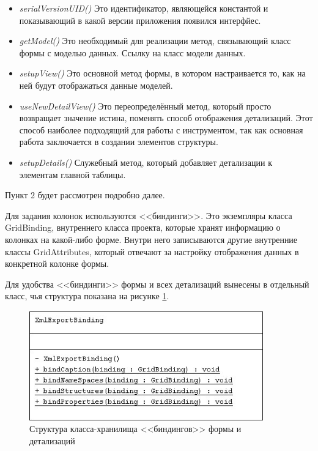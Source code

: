 \documentclass[a4paper,12pt]{diplom}
\begin{document}
\begin{itemize}
    \item \textit{serialVersionUID()} Это идентификатор, являющейся константой и показывающий в какой версии приложения появился интерфйес.
    \item \textit{getModel()} Это необходимый для реализации метод, связывающий класс формы с моделью данных. Ссылку на класс модели данных.
    \item \textit{setupView()} Это основной метод формы, в котором настраивается то, как на ней будут отображаться данные моделей.
    \item \textit{useNewDetailView()} Это переопределённый метод, который просто возвращает значение истина, поменять способ отображения детализаций. Этот способ наиболее подходящий для работы с инструментом, так как основная работа заключается в создании элементов структуры.
    \item \textit{setupDetails()} Служебный метод, который добавляет детализации к элементам главной таблицы.
\end{itemize}

Пункт 2 будет рассмотрен подробно далее. 

Для задания колонок используются <<биндинги>>. Это экземпляры класса GridBinding, внутреннего класса проекта, которые хранят информацию о колонках на какой-либо форме. Внутри него записываются другие внутренние классы GridAttributes, который отвечают за настройку отображения данных в конкретной колонке формы.

Для удобства <<биндинги>> формы и всех детализаций вынесены в отдельный класс, чья структура показана на рисунке \ref{fig:binding}.

\begin{figure}[h!]
	\centering
	\includegraphics[width=0.9\textwidth]{imgs/XmlExportBindings.jpg}
	\caption{Структура класса-хранилища <<биндингов>> формы и детализаций}
	\label{fig:binding}
\end{figure}
\end{document}
